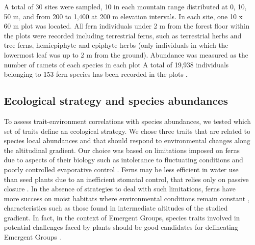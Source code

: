 \documentclass[12pt]{article}
\begin{document}
A total of 30 sites were sampled, 10 in each mountain range %
distributed at 0, 10, 50 m, and from 200 to 1,400 at 200 m elevation
intervals. In each site, one 10 x 60 m plot was
located. %
All fern individuals under 2 m from the forest floor
within the plots were recorded %
including terrestrial ferns, such as terrestrial herbs and tree ferns,
hemiepiphyte and epiphyte herbs (only individuals in which the
lowermost leaf was up to 2 m from the ground).
Abundance was measured
as the number of ramets of each species in each plot %
A total of 19,938 individuals belonging to 153 fern species has been recorded in the plots \cite{Paciencia2008}.

\subsection*{Ecological strategy and species abundances}

To assess trait-environment correlations with species
abundances, we tested which set of traits define an ecological
strategy. We chose three traits that are related to species local
abundances and that should respond to environmental changes along the
altitudinal gradient.  Our choice was based on limitations imposed on
ferns due to aspects of their biology such as intolerance to
fluctuating conditions and poorly controlled evaporative control
\citep{Page2002}. Ferns may be less efficient in water use than seed
plants due to an inefficient stomatal control, that relies only on
passive closure \citep{Brodribb2011}.  In the absence of strategies to
deal with such limitations, ferns have more success on moist habitats
where environmental conditions remain constant \citep{Page2002},
characteristics such as those found in intermediate altitudes of the
studied gradient.  In fact, in the context of Emergent Groups, species
traits involved in potential challenges faced by plants should be good
candidates for delineating Emergent Groups \citep{Herault2007}.
\end{document}
